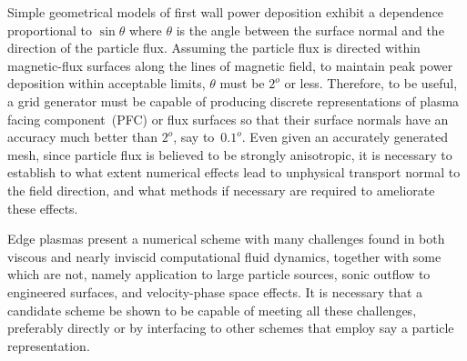 Simple geometrical models of first wall power deposition exhibit a 
dependence proportional to $\sin{\theta}$ where $\theta$ is the
angle between the surface normal and the direction of the particle
flux. Assuming the particle flux is directed within
magnetic-flux surfaces along the lines of magnetic
field, to maintain peak power deposition within acceptable
limits, $\theta$ must be $2^o$ or less. Therefore,
to be useful, a grid generator must be capable of producing
discrete representations of plasma facing component~(PFC) or
flux surfaces so that their surface normals have
an accuracy much better than $2^o$, say to~$0.1^o$.
Even given an accurately generated mesh, since particle flux
is believed to be strongly anisotropic, it is necessary to
establish to what extent numerical effects lead to
unphysical transport normal to the field direction,
and what methods if necessary are required to ameliorate
these effects.

Edge plasmas present a numerical scheme with many challenges
found in both viscous and nearly inviscid computational fluid
dynamics, together with some which are not, namely
application to large particle sources, sonic outflow to engineered
surfaces, and velocity-phase space effects. It is necessary
that a candidate scheme be shown to be capable of meeting all these
challenges, preferably directly or by interfacing to other schemes that
employ say a particle representation.

